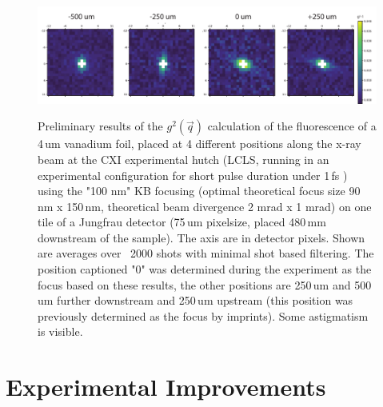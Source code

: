 \begin{figure}
	\centering
	\includegraphics[width=\linewidth]{images/lv65_vanadium.pdf}
	\label{fig:outlook_vanadium}
	\caption[Focus finding using IDI]{Preliminary results of the $g^2(\vec{q})$ calculation of the fluorescence of a 4\,um vanadium foil, placed at 4 different positions along the x-ray beam at the CXI experimental hutch (LCLS, running in an experimental configuration for short pulse duration under 1\,fs \cite{subfs2017,argosecond}) using the "100 nm" KB focusing (optimal theoretical focus size 90\,nm x 150\,nm, theoretical beam divergence 2 mrad x 1 mrad) on one tile of a Jungfrau detector (75\,um pixelsize, placed 480\,mm downstream of the sample). The axis are in detector pixels. Shown are averages over ~2000 shots with minimal shot based filtering. The position captioned "0" was determined during the experiment as the focus based on these results, the other positions are 250\,um and 500\,um further downstream and 250\,um upstream (this position was previously determined as the focus by imprints).  Some astigmatism is visible.}
\end{figure}

\section{Experimental Improvements}

